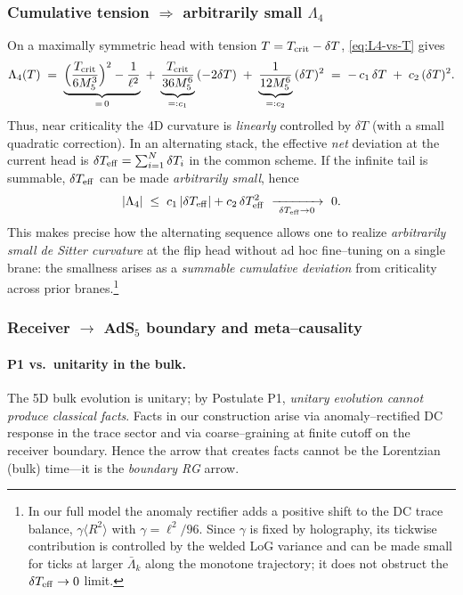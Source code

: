 \documentclass[10pt]{article}
\theoremstyle{definition}
\theoremstyle{plain}
\begin{document}
\subsubsection*{\texorpdfstring{Cumulative tension \(\Rightarrow\) arbitrarily small \(\Lambda_4\)}{Cumulative tension => arbitrarily small Lambda_4}}
\label{subsubsec:cum-tension-l4}

On a maximally symmetric head with tension \(T=T_{\rm crit}-\delta T\), \eqref{eq:L4-vs-T} gives
\begin{equation}
\Lambda_4(T)\;=\; 
\underbrace{\Big(\frac{T_{\rm crit}}{6M_5^3}\Big)^2-\frac{1}{\ell^2}}_{=\,0}
\;+\;\underbrace{\frac{T_{\rm crit}}{36 M_5^6}}_{=:c_1}\,(-2\delta T)
\;+\;\underbrace{\frac{1}{12M_5^6}}_{=:c_2}\,(\delta T)^2
\;=\;-\,c_1\,\delta T\;+\;c_2\,(\delta T)^2.
\label{eq:L4-expansion}
\end{equation}
Thus, near criticality the 4D curvature is \emph{linearly} controlled by \(\delta T\) (with a small quadratic correction). 
In an alternating stack, the effective \emph{net} deviation at the current head is
\(
\delta T_{\rm eff}=\sum_{i=1}^{N}\delta T_i
\)
in the common scheme. If the infinite tail is summable, \(\delta T_{\rm eff}\) can be made \emph{arbitrarily small}, hence
\begin{equation}
|\Lambda_4|\;\le\; c_1\,|\delta T_{\rm eff}|+c_2\,\delta T_{\rm eff}^2\ \xrightarrow[\ \delta T_{\rm eff}\to 0\ ]{}\ 0.
\end{equation}
This makes precise how the alternating sequence allows one to realize \emph{arbitrarily small de Sitter curvature} at the flip head without ad hoc fine–tuning on a single brane: the smallness arises as a \emph{summable cumulative deviation} from criticality across prior branes.\footnote{In our full model the anomaly rectifier adds a positive shift to the DC trace balance, \(\gamma\langle R^2\rangle\) with \(\gamma=\ell^2/96\). Since \(\gamma\) is fixed by holography, its tickwise contribution is controlled by the welded LoG variance and can be made small for ticks at larger \(\bar\Lambda_k\) along the monotone trajectory; it does not obstruct the \(\delta T_{\rm eff}\to 0\) limit.}

\subsubsection*{\texorpdfstring{Receiver \(\to\) AdS$_5$ boundary and meta–causality}{Receiver -> AdS5 boundary and meta-causality}}
\label{subsubsec:meta-causality}

\paragraph{P1 vs.\ unitarity in the bulk.}\label{par:uom-main-112}
The 5D bulk evolution is unitary; by Postulate P1, \emph{unitary evolution cannot produce classical facts}. 
Facts in our construction arise via anomaly–rectified DC response in the trace sector and via coarse–graining at finite cutoff on the receiver boundary. 
Hence the arrow that creates facts cannot be the Lorentzian (bulk) time—it is the \emph{boundary RG} arrow.
\end{document}
